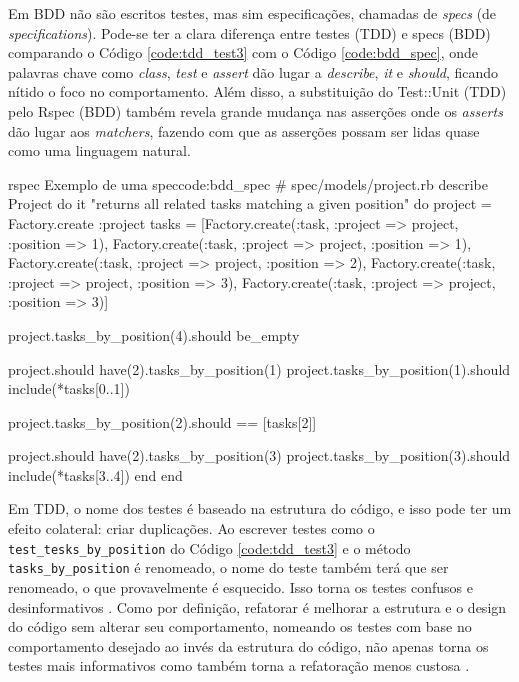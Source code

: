 Em BDD não são escritos testes, mas sim especificações, chamadas de \textit{specs} (de \textit{specifications}). Pode-se ter a clara diferença entre testes (TDD) e specs (BDD) comparando o Código \ref{code:tdd_test3} com o Código \ref{code:bdd_spec}, onde palavras chave como \textit{class}, \textit{test} e \textit{assert} dão lugar a \textit{describe}, \textit{it} e \textit{should}, ficando nítido o foco no comportamento. Além disso, a substituição do Test::Unit (TDD) pelo Rspec (BDD) também revela grande mudança nas asserções onde os \textit{asserts} dão lugar aos \textit{matchers}, fazendo com que as asserções possam ser lidas quase como uma linguagem natural.

\begin{mycode}{rspec}%
{Exemplo de uma spec}{code:bdd_spec}
# spec/models/project.rb
describe Project do
  it "returns all related tasks matching a given position" do
    project = Factory.create :project
    tasks = [Factory.create(:task, :project => project, :position => 1),
             Factory.create(:task, :project => project, :position => 1),
             Factory.create(:task, :project => project, :position => 2),
             Factory.create(:task, :project => project, :position => 3),
             Factory.create(:task, :project => project, :position => 3)]

    project.tasks_by_position(4).should be_empty

    project.should have(2).tasks_by_position(1)
    project.tasks_by_position(1).should include(*tasks[0..1])

    project.tasks_by_position(2).should == [tasks[2]]

    project.should have(2).tasks_by_position(3)
    project.tasks_by_position(3).should include(*tasks[3..4])
  end
end
\end{mycode}

Em TDD, o nome dos testes é baseado na estrutura do código, e isso pode ter um efeito colateral: criar duplicações. Ao escrever testes como o \texttt{test\_tesks\_by\_position} do Código \ref{code:tdd_test3} e o método \texttt{tasks\_by\_position} é renomeado, o nome do teste também terá que ser renomeado, o que provavelmente é esquecido. Isso torna os testes confusos e desinformativos \cite{ContinuousTesting}. Como por definição, refatorar é melhorar a estrutura e o design do código sem alterar seu comportamento, nomeando os testes com base no comportamento desejado ao invés da estrutura do código, não apenas torna os testes mais informativos como também torna a refatoração menos custosa \cite{ContinuousTesting}.

